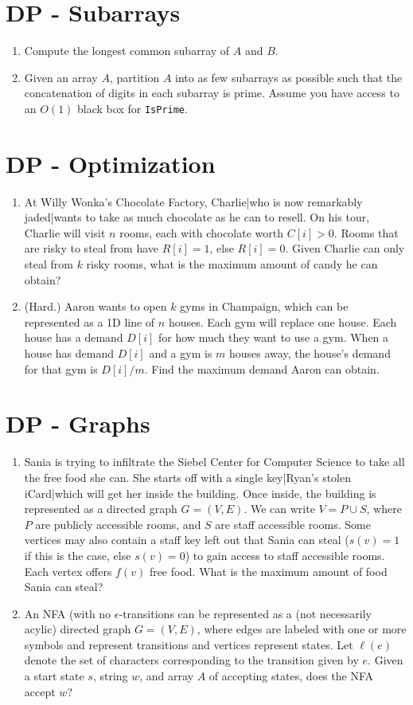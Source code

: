 \documentclass[fleqn]{article}
\begin{document}
\section{DP - Subarrays}
\begin{enumerate}
    \item Compute the longest common subarray of $A$ and $B$.
    \item Given an array $A$, partition $A$ into as few subarrays as possible such that the concatenation of digits in each subarray is prime. Assume you have access to an $O(1)$ black box for \texttt{IsPrime}.
\end{enumerate}

\section{DP - Optimization}
\begin{enumerate}
    \item At Willy Wonka's Chocolate Factory, Charlie|who is now remarkably jaded|wants to take as much chocolate as he can to resell. On his tour, Charlie will visit $n$ rooms, each with chocolate worth $C[i]> 0$. Rooms that are risky to steal from have $R[i] = 1$, else $R[i] = 0$. Given Charlie can only steal from $k$ risky rooms, what is the maximum amount of candy he can obtain?
    \item (Hard.) Aaron wants to open $k$ gyms in Champaign, which can be represented as a 1D line of $n$ houses. Each gym will replace one house. Each house has a demand $D[i]$ for how much they want to use a gym. When a house has demand $D[i]$ and a gym is $m$ houses away, the house's demand for that gym is $D[i]/m$. Find the maximum demand Aaron can obtain.
\end{enumerate}

\section{DP - Graphs}
\begin{enumerate}
    \item Sania is trying to infiltrate the Siebel Center for Computer Science to take all the free food she can. She starts off with a single key|Ryan's stolen iCard|which will get her inside the building. Once inside, the building is represented as a directed graph $G = (V, E)$. We can write $V = P \cup S$, where $P$ are publicly accessible rooms, and $S$ are staff accessible rooms. Some vertices may also contain a staff key left out that Sania can steal ($s(v) = 1$ if this is the case, else $s(v) = 0$) to gain access to staff accessible rooms. Each vertex offers $f(v)$ free food. What is the maximum amount of food Sania can steal?
    \item An NFA (with no $\epsilon$-transitions can be represented as a (not necessarily acylic) directed graph $G = (V, E)$, where edges are labeled with one or more symbols and represent transitions and vertices represent states. Let $\ell(e)$ denote the set of characters corresponding to the transition given by $e$. Given a start state $s$, string $w$, and array $A$ of accepting states, does the NFA accept $w$?
\end{enumerate}
\end{document}
